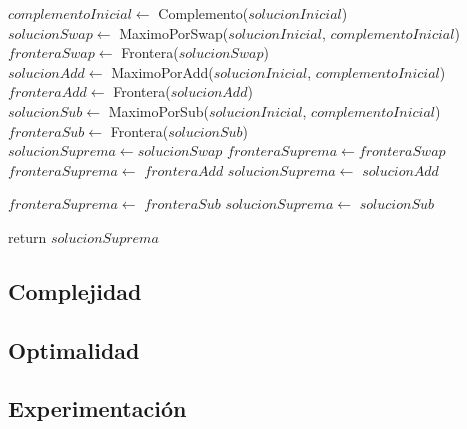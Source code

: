 \begin{algorithm}[H]
\begin{algorithmic}
    \State $complementoInicial \gets$ Complemento($solucionInicial$) \\

    \State $solucionSwap \gets$ MaximoPorSwap($solucionInicial$, $complementoInicial$)
    \State $fronteraSwap \gets$ Frontera($solucionSwap$) \\

    \State $solucionAdd \gets$ MaximoPorAdd($solucionInicial$, $complementoInicial$)
    \State $fronteraAdd \gets$ Frontera($solucionAdd$) \\

    \State $solucionSub \gets$ MaximoPorSub($solucionInicial$, $complementoInicial$)
    \State $fronteraSub \gets$ Frontera($solucionSub$) \\


    \State $solucionSuprema \gets solucionSwap$
    \State $fronteraSuprema \gets fronteraSwap$ \\

        \State $fronteraSuprema \gets$ $fronteraAdd$
        \State $solucionSuprema \gets$ $solucionAdd$  \\
    \EndIf

        \State $fronteraSuprema \gets$ $fronteraSub$
        \State $solucionSuprema \gets$ $solucionSub$ \\
    \EndIf

    \State return $solucionSuprema$
\EndFunction

\end{algorithmic}
\end{algorithm}



\subsection{Complejidad}

\subsection{Optimalidad}

\subsection{Experimentación}